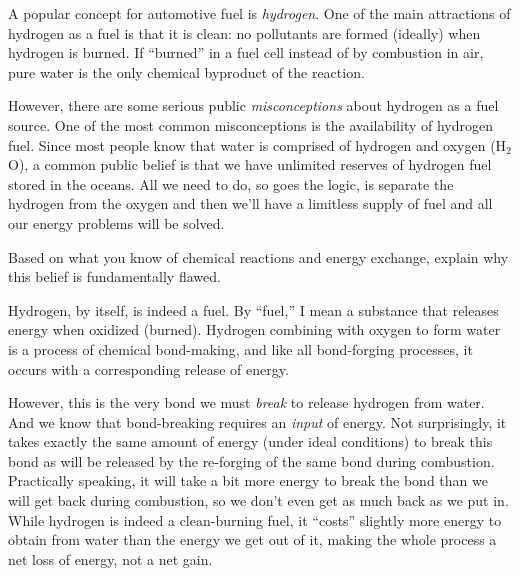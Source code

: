 

A popular concept for automotive fuel is {\it hydrogen}.  One of the main attractions of hydrogen as a fuel is that it is clean: no pollutants are formed (ideally) when hydrogen is burned.  If ``burned'' in a fuel cell instead of by combustion in air, pure water is the only chemical byproduct of the reaction.

However, there are some serious public {\it misconceptions} about hydrogen as a fuel source.  One of the most common misconceptions is the availability of hydrogen fuel.  Since most people know that water is comprised of hydrogen and oxygen (H$_{2}$O), a common public belief is that we have unlimited reserves of hydrogen fuel stored in the oceans.  All we need to do, so goes the logic, is separate the hydrogen from the oxygen and then we'll have a limitless supply of fuel and all our energy problems will be solved.

Based on what you know of chemical reactions and energy exchange, explain why this belief is fundamentally flawed.







Hydrogen, by itself, is indeed a fuel.  By ``fuel,'' I mean a substance that releases energy when oxidized (burned).  Hydrogen combining with oxygen to form water is a process of chemical bond-making, and like all bond-forging processes, it occurs with a corresponding release of energy.

However, this is the very bond we must {\it break} to release hydrogen from water.  And we know that bond-breaking requires an {\it input} of energy.  Not surprisingly, it takes exactly the same amount of energy (under ideal conditions) to break this bond as will be released by the re-forging of the same bond during combustion.  Practically speaking, it will take a bit more energy to break the bond than we will get back during combustion, so we don't even get as much back as we put in.  While hydrogen is indeed a clean-burning fuel, it ``costs'' slightly more energy to obtain from water than the energy we get out of it, making the whole process a net loss of energy, not a net gain.


